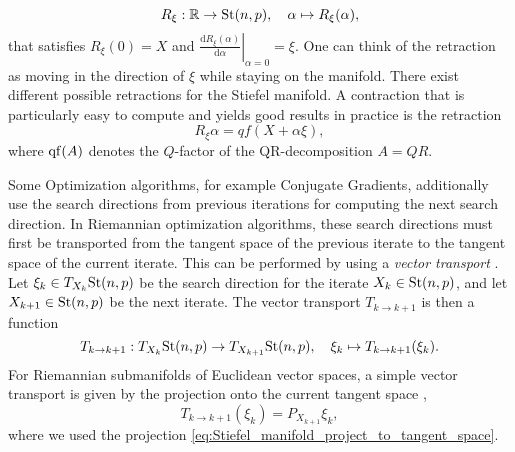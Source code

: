 \begin{equation}
	R_\xi : \mathbb{R} \rightarrow \text{St}(n,p), \quad \alpha \mapsto R_\xi(\alpha),
\end{equation}
that satisfies $R_\xi(0) = X$ and $\left.\frac{\text{d}R_\xi(\alpha)}{\text{d}\alpha}\right|_{\alpha=0} = \xi$. One can think of the retraction as moving in the direction of $\xi$ while staying on the manifold. There exist different possible retractions for the Stiefel manifold. A contraction that is particularly easy to compute and yields good results in practice is the retraction
\begin{equation}
	R_\xi{\alpha} = qf(X+\alpha\xi),
\end{equation}
where $\operatorname{qf}(A)$ denotes the $Q$-factor of the QR-decomposition $A = QR$. \par
Some Optimization algorithms, for example Conjugate Gradients, additionally use the search directions from previous iterations for computing the next search direction. In Riemannian optimization algorithms, these search directions must first be transported from the tangent space of the previous iterate to the tangent space of the current iterate. This can be performed by using a \textit{vector transport} \cite{cite:optimization_on_matrix_manifolds}. Let $\xi_k\in T_{X_k} \text{St}(n,p)$ be the search direction for the iterate $X_k \in\text{St}(n,p)$, and let $X_{k+1}\in\text{St}(n,p)$ be the next iterate. The vector transport $T_{k\rightarrow k+1}$ is then a function
\begin{equation}
	\label{eq:vector transport}
	T_{k\rightarrow k+1} : T_{X_k} \text{St}(n,p) \rightarrow T_{X_{k+1}} \text{St}(n,p), \quad \xi_k \mapsto T_{k\rightarrow k+1}(\xi_k).
\end{equation}
For Riemannian submanifolds of Euclidean vector spaces, a simple vector transport is given by the projection onto the current tangent space \cite{cite:optimization_on_matrix_manifolds},
\begin{equation}
	\label{eq:vector_transport_stiefel_manifold}
	T_{k\rightarrow k+1}(\xi_k) = P_{X_{k+1}}\xi_k,
\end{equation}
where we used the projection \eqref{eq:Stiefel_manifold_project_to_tangent_space}.